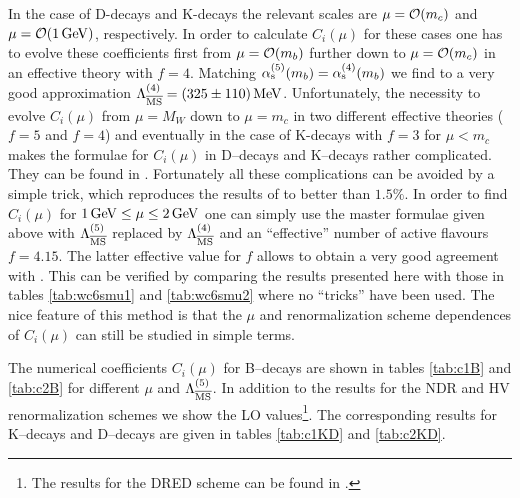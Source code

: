 In the case of D-decays and K-decays the relevant scales are
$\mu={\cal O}(m_c)$ and $\mu={\cal O}(1\, {\rm GeV})$, respectively. In order to
calculate $C_i(\mu)$ for these cases one has to evolve these
coefficients first from $\mu={\cal O}(m_b)$ further down to $\mu={\cal O}(m_c)$ in
an effective theory with $f=4$. Matching $\alpha_{\rm s}^{(5)}(m_b) = \alpha_{\rm s}^{(4)}(m_b)$
we find to a very good approximation $\Lambda_{\overline{\rm MS}}^{(4)}=(325\pm110)\, {\rm MeV}$.
Unfortunately, the necessity to evolve $C_i(\mu)$ from $\mu=M_W$ down to
$\mu=m_c$ in two different effective theories ($f=5$ and $f=4$) and
eventually in the case of K-decays with $f=3$ for $\mu< m_c$ makes the
formulae for $C_i(\mu)$ in D--decays and K--decays rather complicated.
They can be found in \cite{burasetal:92d}. Fortunately all these
complications can be avoided by a simple trick, which reproduces the
results of \cite{burasetal:92d} to better than $1.5\%$.  In order to
find $C_i(\mu)$ for $1\, {\rm GeV}\leq\mu\leq 2\, {\rm GeV}$ one can simply use the
master formulae given above with $\Lambda_{\overline{\rm MS}}^{(5)}$ replaced by $\Lambda_{\overline{\rm MS}}^{(4)}$
and an ``{effective}'' number of active flavours $f=4.15$. The latter
effective value for $f$ allows to obtain a very good agreement with
\cite{burasetal:92d}.  This can be verified by comparing the results
presented here with those in tables \ref{tab:wc6smu1} and
\ref{tab:wc6smu2} where no ``tricks'' have been used.  The nice feature
of this method is that the $\mu$ and renormalization scheme dependences
of $C_i(\mu)$ can still be studied in simple terms.

The numerical coefficients $C_i(\mu)$ for B--decays are shown in tables
\ref{tab:c1B} and \ref{tab:c2B} for different $\mu$ and  $\Lambda_{\overline{\rm MS}}^{(5)}$.
In addition to the results for the NDR and HV renormalization schemes
we show the LO values\footnote{The results for the DRED scheme can be
found in \cite{buras:94}.}. The corresponding results for K--decays and
D--decays are given in tables \ref{tab:c1KD} and \ref{tab:c2KD}.

